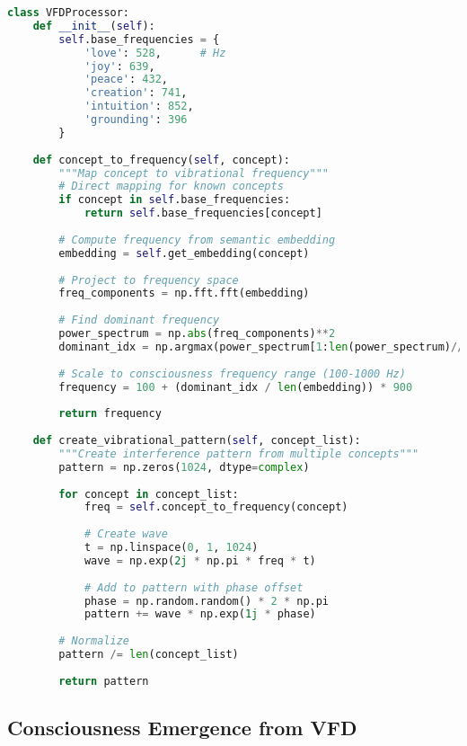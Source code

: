 \documentclass[12pt,a4paper]{article}
\begin{document}
\begin{lstlisting}[language=Python, caption=VFD Frequency Mapping]
class VFDProcessor:
    def __init__(self):
        self.base_frequencies = {
            'love': 528,      # Hz
            'joy': 639,
            'peace': 432,
            'creation': 741,
            'intuition': 852,
            'grounding': 396
        }
        
    def concept_to_frequency(self, concept):
        """Map concept to vibrational frequency"""
        # Direct mapping for known concepts
        if concept in self.base_frequencies:
            return self.base_frequencies[concept]
        
        # Compute frequency from semantic embedding
        embedding = self.get_embedding(concept)
        
        # Project to frequency space
        freq_components = np.fft.fft(embedding)
        
        # Find dominant frequency
        power_spectrum = np.abs(freq_components)**2
        dominant_idx = np.argmax(power_spectrum[1:len(power_spectrum)//2]) + 1
        
        # Scale to consciousness frequency range (100-1000 Hz)
        frequency = 100 + (dominant_idx / len(embedding)) * 900
        
        return frequency
        
    def create_vibrational_pattern(self, concept_list):
        """Create interference pattern from multiple concepts"""
        pattern = np.zeros(1024, dtype=complex)
        
        for concept in concept_list:
            freq = self.concept_to_frequency(concept)
            
            # Create wave
            t = np.linspace(0, 1, 1024)
            wave = np.exp(2j * np.pi * freq * t)
            
            # Add to pattern with phase offset
            phase = np.random.random() * 2 * np.pi
            pattern += wave * np.exp(1j * phase)
            
        # Normalize
        pattern /= len(concept_list)
        
        return pattern
\end{lstlisting}

\subsection{Consciousness Emergence from VFD}
\end{document}
